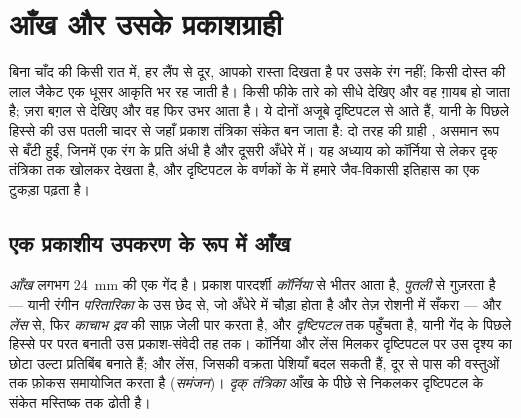\chapter{आँख और उसके प्रकाशग्राही}\label{ch:g11:the-eye}

बिना चाँद की किसी रात में, हर लैंप से दूर, आपको रास्ता दिखता है पर उसके रंग
नहीं; किसी दोस्त की लाल जैकेट एक धूसर आकृति भर रह जाती है। किसी फीके तारे
को सीधे देखिए और वह ग़ायब हो जाता है; ज़रा बग़ल से देखिए और वह फिर उभर आता
है। ये दोनों अजूबे दृष्टिपटल से आते हैं, यानी  के पिछले हिस्से की उस
पतली चादर से जहाँ प्रकाश तंत्रिका संकेत बन जाता है: दो तरह की ग्राही
, असमान रूप से बँटी हुईं, जिनमें एक रंग के प्रति अंधी है और दूसरी
अँधेरे में। यह अध्याय  को कॉर्निया से लेकर दृक् तंत्रिका तक खोलकर देखता
है, और दृष्टिपटल के वर्णकों के  में हमारे जैव-विकासी इतिहास का एक
टुकड़ा पढ़ता है।

\section{एक प्रकाशीय उपकरण के रूप में आँख}

\begin{definition}[आँख के हिस्से]\label{def:g11:the-eye:parts}
\emph{आँख} लगभग \qty{24}{mm} की एक गेंद है। प्रकाश पारदर्शी
\emph{कॉर्निया} से भीतर आता है, \emph{पुतली} से गुज़रता है --- यानी रंगीन
\emph{परितारिका} के उस छेद से, जो अँधेरे में चौड़ा होता है और तेज़ रोशनी में
सँकरा --- और \emph{लेंस} से, फिर \emph{काचाभ द्रव} की साफ़ जेली पार करता
है, और \emph{दृष्टिपटल} तक पहुँचता है, यानी गेंद के पिछले हिस्से पर परत
बनाती उस प्रकाश-संवेदी तह तक। कॉर्निया और लेंस मिलकर दृष्टिपटल पर उस दृश्य
का छोटा उल्टा प्रतिबिंब बनाते हैं; और लेंस, जिसकी वक्रता पेशियाँ बदल सकती
हैं, दूर से पास की वस्तुओं तक फ़ोकस समायोजित करता है (\emph{समंजन})।
\emph{दृक् तंत्रिका} आँख के पीछे से निकलकर दृष्टिपटल के संकेत मस्तिष्क तक
ढोती है।
\end{definition}

